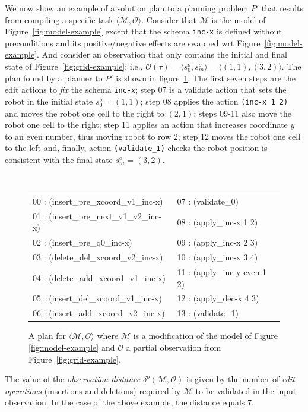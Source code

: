 \documentclass[letterpaper]{article} %
\newcommand{\tup}[1]{{\langle #1 \rangle}}
\begin{document}
We now show an example of a solution plan to a planning problem $P'$ that results from compiling a specific task $\tup{\mathcal{M},\mathcal{O}}$. Consider that $\mathcal{M}$ is the model of Figure~\ref{fig:model-example} except that the schema {\tt\small inc-x} is defined without preconditions and its positive/negative effects are swapped wrt Figure~\ref{fig:model-example}. And consider an observation that only contains the initial and final state of Figure~\ref{fig:grid-example}; i.e., $\mathcal{O(\tau)}=\tup{s_0^o,s_m^o}=\tup{(1,1),(3,2)}$. The plan found by a planner to $P'$ is shown in figure~\ref{fig:plan-pdistance}. The first seven steps are the edit actions to \emph{fix} the schema {\tt\small inc-x}; step 07 is a validate action that sets the robot in the initial state $s_0^o=(1,1)$; step 08 applies the action {\tt\small (inc-x 1 2)} and moves the robot one cell to the right to $(2,1)$; steps 09-11 also move the robot one cell to the right; step 11 applies an action that increases coordinate $y$ to an even number, thus moving robot to row $2$; step 12 moves the robot one cell to the left and, finally, action {\tt\small (validate\_1)} checks the robot position is consistent with the final state $s_m^o=(3,2)$.


\begin{figure}
{\tt\tiny
\begin{tabular}{ll}
00 : (insert\_pre\_xcoord\_v1\_inc-x)   & 07 : (validate\_0)\\
01 : (insert\_pre\_next\_v1\_v2\_inc-x) & 08 : (apply\_inc-x 1 2)\\
02 : (insert\_pre\_q0\_inc-x)           & 09 : (apply\_inc-x 2 3)\\
03 : (delete\_del\_xcoord\_v2\_inc-x)   & 10 : (apply\_inc-x 3 4) \\
04 : (delete\_add\_xcoord\_v1\_inc-x)   & 11 : (apply\_inc-y-even 1 2)\\
05 : (insert\_del\_xcoord\_v1\_inc-x)   & 12 : (apply\_dec-x 4 3)\\
06 : (insert\_add\_xcoord\_v2\_inc-x)   & 13 : (validate\_1)
\end{tabular}
}
 \caption{\small A plan for $\tup{\mathcal{M},\mathcal{O}}$ where $\mathcal{M}$ is a modification of the model of Figure \ref{fig:model-example} and $\mathcal{O}$ a partial observation from Figure~\ref{fig:grid-example}.}
\label{fig:plan-pdistance}
\end{figure}


The value of the {\em observation distance} $\delta^o(\mathcal{M},\mathcal{O})$ is given by the number of {\em edit operations} (insertions and deletions) required by $\mathcal{M}$ to be validated in the input observation. In the case of the above example, the distance equals $7$.
\end{document}

